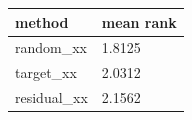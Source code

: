 \begin{tabular}{ll}
\toprule
method & mean rank \\
\midrule
random\_xx & 1.8125 \\
target\_xx & 2.0312 \\
residual\_xx & 2.1562 \\
\bottomrule
\end{tabular}
